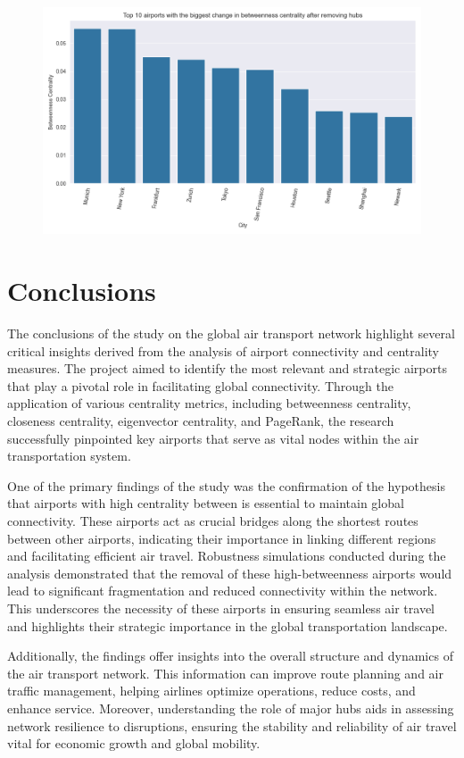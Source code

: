 \documentclass[12pt]{article}
\begin{document}
    \begin{figure}[H]
        \centering
        \includegraphics[width=0.8\linewidth]{img/biggest_changes_betweenness_centrality}
    \end{figure}


    \section{Conclusions}\label{sec:conclusions}
    The conclusions of the study on the global air transport network highlight several critical insights derived from the analysis of airport connectivity and centrality measures. The project aimed to identify the most relevant and strategic airports that play a pivotal role in facilitating global connectivity. Through the application of various centrality metrics, including betweenness centrality, closeness centrality, eigenvector centrality, and PageRank, the research successfully pinpointed key airports that serve as vital nodes within the air transportation system.

    One of the primary findings of the study was the confirmation of the hypothesis that airports with high centrality between is essential to maintain global connectivity. These airports act as crucial bridges along the shortest routes between other airports, indicating their importance in linking different regions and facilitating efficient air travel. Robustness simulations conducted during the analysis demonstrated that the removal of these high-betweenness airports would lead to significant fragmentation and reduced connectivity within the network. This underscores the necessity of these airports in ensuring seamless air travel and highlights their strategic importance in the global transportation landscape.

    Additionally, the findings offer insights into the overall structure and dynamics of the air transport network. This information can improve route planning and air traffic management, helping airlines optimize operations, reduce costs, and enhance service. Moreover, understanding the role of major hubs aids in assessing network resilience to disruptions, ensuring the stability and reliability of air travel vital for economic growth and global mobility.
\end{document}
